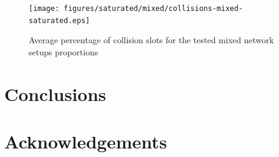 \documentclass[a4paper,journal]{IEEEtran}
\begin{document}
	\begin{figure}[tb]
		\centering
		\texttt{[image: figures/saturated/mixed/collisions-mixed-saturated.eps]}
		\caption{Average percentage of collision slots for the tested mixed network setups proportions}
		\label{fig:mixedCollisions-sat}
	\end{figure}
		
	
\section{Conclusions}\label{conclusions}
\section{Acknowledgements}




\end{document}
